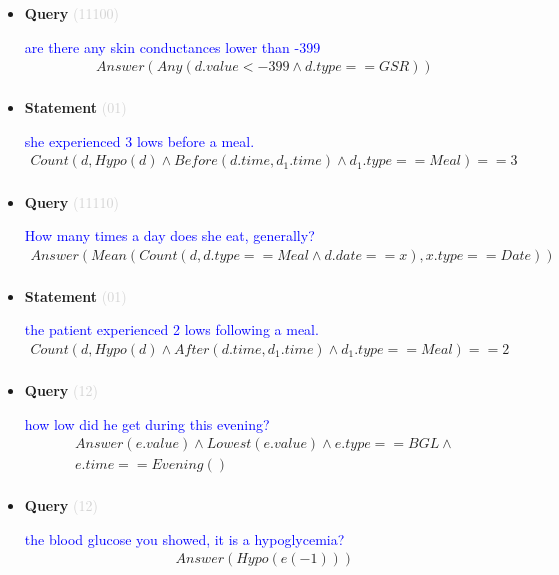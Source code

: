 \documentclass[11pt]{article}
\newcommand{\key}[1]{\textcolor{lightgray}{#1}}
\newcounter{CQuery}
\newcounter{CStatement}
\begin{document}
\begin{itemize}
\item
\textbf{Query\theCQuery} \key{(11100)} \addtocounter{CQuery}{1}
\textcolor{blue}{ are there any skin conductances lower than -399 }
\begin{multline*}
Answer(Any(d.value<-399 \wedge d.type==GSR)) \\ 
\end{multline*}


\item
\textbf{Statement\theCStatement} \key{(01)} \addtocounter{CStatement}{1}
\textcolor{blue}{ she experienced 3 lows before a meal. }
\begin{multline*}
Count(d, Hypo(d) \wedge Before(d.time, d_1.time) \wedge d_1.type==Meal)==3 \\ 
\end{multline*}


\item
\textbf{Query\theCQuery} \key{(11110)} \addtocounter{CQuery}{1}
\textcolor{blue}{ How many times a day does she eat, generally? }
\begin{multline*}
Answer(Mean(Count(d, d.type==Meal \wedge d.date==x), x.type==Date)) \\ 
\end{multline*}


\item
\textbf{Statement\theCStatement} \key{(01)} \addtocounter{CStatement}{1}
\textcolor{blue}{ the patient experienced 2 lows following a meal. }
\begin{multline*}
Count(d, Hypo(d) \wedge After(d.time, d_1.time) \wedge d_1.type==Meal)==2 \\ 
\end{multline*}


\item
\textbf{Query\theCQuery} \key{(12)} \addtocounter{CQuery}{1}
\textcolor{blue}{ how low did he get during this evening? }
\begin{multline*}
Answer(e.value) \wedge Lowest(e.value) \wedge e.type==BGL \wedge \\ 
e.time==Evening() \\ 
\end{multline*}


\item
\textbf{Query\theCQuery} \key{(12)} \addtocounter{CQuery}{1}
\textcolor{blue}{ the blood glucose you showed, it is a hypoglycemia? }
\begin{multline*}
Answer(Hypo(e(-1))) \\ 
\end{multline*}



\end{itemize}
\end{document}
